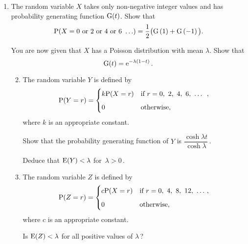 \documentclass[a4, 11pt]{report}
\newlength{\qspace}
\newcounter{qnumber}
\newenvironment{question}%
 {\vspace{\qspace}
  \begin{enumerate}[\bfseries 1\quad][10]%
    \setcounter{enumi}{\value{qnumber}}%
    \item%
 }
{
  \end{enumerate}
  \filbreak
  \stepcounter{qnumber}
 }
\newenvironment{questionparts}[1][1]%
 {
  \begin{enumerate}[\bfseries (i)]%
    \setcounter{enumii}{#1}
    \addtocounter{enumii}{-1}
    \setlength{\itemsep}{3mm}
    \setlength{\parskip}{8pt}
 }
 {
  \end{enumerate}
 }
\def\e{{\rm e}}
\def\E{{\rm E}}
\def\G{{\rm G}}
\def\P{{\rm P}}
\begin{document}
\begin{question}

The random variable 
$X$ takes only non-negative integer 
values and has  probability generating function 
$\G(t)$. 
Show that 
\[
\P(X = 0 \text{ or } 2 \text{ or } 4 \text { or }  6 \   \ldots ) 
= \frac{1}{2}\big(\G\left(1\right)+\G\left(-1\right)\big).
\]

You are now given that $X$ has a Poisson distribution 
with mean $\lambda$.  Show that
\[
\G(t) = \e^{-\lambda(1-t)}
\,.
\]
\begin{questionparts}
\item
The random variable $Y$ is defined by 
\[
\P(Y=r)=
\begin{cases}
k\P(X=r) &  \text{if $r=0, \ 2, \ 4, \ 6, \ \ldots$ \ }, \\[2mm]
 0& \text{otherwise}, 
\end{cases}
\]
where $k$ is an appropriate constant.

Show that
 the probability generating function of $Y$ is $\dfrac{\cosh\lambda t}{\cosh\lambda}\,$. 

Deduce that 
\mbox{$\E(Y)<\lambda$} 
for~$\lambda>0\,$. 

\item The random variable $Z$ is defined by 
\[\P(Z=r)=
\begin{cases}
        c \P(X=r) &  
\text{if $r = 0, \ 4, \ 8, \ 12, \ \ldots \ $}, \\[2mm]
 0& \text{otherwise,} 
\end{cases}
\]
where $c    $ is an appropriate constant.

Is 
$\E(Z)<\lambda$
 for all positive values of $\lambda\,$?  


\end{questionparts}
\end{question}
\end{document}
